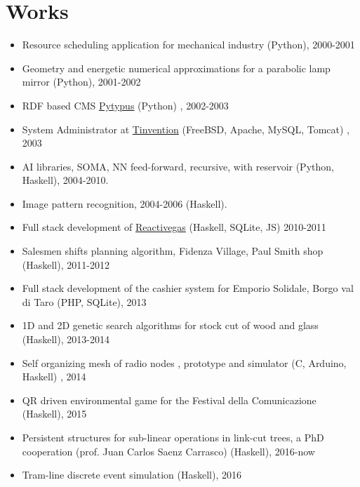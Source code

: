 \documentclass[letterpaper,12pt,oneside]{article}
\begin{document}
    \section*{Works}
        \begin{itemize}
            \item Resource scheduling application for mechanical industry (Python), 2000-2001 
            \item Geometry and energetic numerical approximations for a parabolic lamp mirror    (Python), 2001-2002 
            \item RDF based CMS \href{http://pytypus.cvs.sourceforge.net/viewvc/pytypus/}{Pytypus}  (Python) , 2002-2003 
            \item System Administrator at \href{http://tinvention.net}{Tinvention} (FreeBSD, Apache, MySQL, Tomcat) , 2003
            \item AI libraries, SOMA, NN feed-forward, recursive, with reservoir (Python, Haskell), 2004-2010. 
            \item Image pattern recognition, 2004-2006 (Haskell). 
            \item Full stack development of \href {https://lambdasistemi.net/reactivegas}{Reactivegas} (Haskell, SQLite, JS) 2010-2011 
            \item Salesmen shifts planning algorithm, Fidenza Village, Paul Smith shop (Haskell), 2011-2012 
            \item Full stack development of the cashier system for Emporio Solidale, Borgo val di Taro (PHP, SQLite), 2013 
            \item 1D and 2D genetic search algorithms for stock cut of wood and glass (Haskell), 2013-2014 
            \item Self organizing mesh of radio nodes , prototype and simulator (C, Arduino, Haskell) , 2014 
            \item QR driven environmental game for the Festival della Comunicazione (Haskell), 2015 
            \item Persistent structures for sub-linear operations in link-cut trees, a PhD cooperation (prof. Juan Carlos Saenz Carrasco) (Haskell), 2016-now  
            \item Tram-line discrete event simulation (Haskell), 2016 
        \end{itemize}
\end{document}
